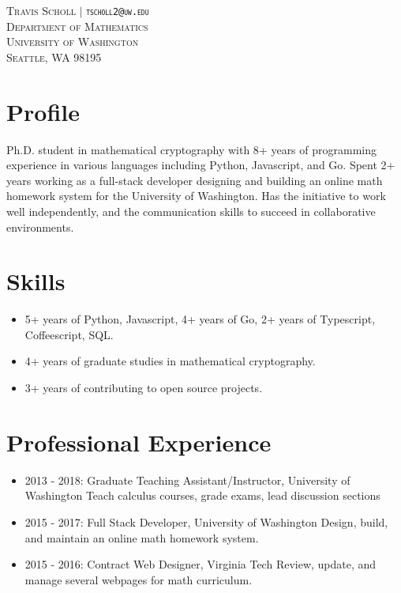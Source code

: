 \documentclass{article}
\begin{document}
	
	\vspace*{-1.25in}
	
	\begin{center}
	\textsc{
		Travis Scholl $\vert$ {\tt tscholl2@uw.edu} \\
		Department of Mathematics \\
		University of Washington \\
		Seattle, WA 98195
	}
	\end{center}
	
	\section{Profile}
	
	Ph.D. student in mathematical cryptography with 8+ years of programming experience in various languages including Python, Javascript, and Go. Spent 2+ years working as a full-stack developer designing and building an online math homework system for the University of Washington. Has the initiative to work well independently, and the communication skills to succeed in collaborative environments.
	
	\section{Skills}
	
	\begin{itemize} 
		\item 5+ years of Python, Javascript, 4+ years of Go, 2+ years of Typescript, Coffeescript, SQL.
		\item 4+ years of graduate studies in mathematical cryptography.
		\item 3+ years of contributing to open source projects.
	\end{itemize}

	\section{Professional Experience}
	
	\begin{itemize}  
		\item 2013 - 2018: Graduate Teaching Assistant/Instructor, University of Washington
			\subitem Teach calculus courses, grade exams, lead discussion sections
		\item 2015 - 2017: Full Stack Developer, University of Washington
			\subitem Design, build, and maintain an online math homework system.
		\item 2015 - 2016: Contract Web Designer, Virginia Tech
			\subitem Review, update, and manage several webpages for math curriculum.
	\end{itemize}
	
\end{document}
